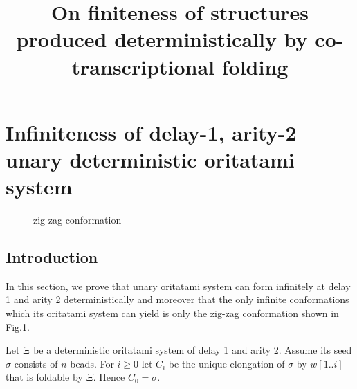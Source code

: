 \documentclass[runningheads]{llncs}
\begin{document}
\title{On finiteness of structures produced deterministically by co-transcriptional folding}

\section{Infiniteness of delay-1, arity-2 unary deterministic oritatami system}

\begin{figure}
  \begin{center}
    \caption{zig-zag conformation}
    \label{TTT_zigzag}
  \end{center}
\end{figure}

\subsection{Introduction}


In this section, we prove that unary oritatami system can form infinitely at delay 1 and arity 2 deterministically and moreover that the only infinite conformations which its oritatami system can yield is only the zig-zag conformation shown in Fig.\ref{TTT_zigzag}. 


Let $\Xi$ be a deterministic oritatami system of delay 1 and arity 2. Assume its seed $\sigma$ consists of $n$ beads.
For $i \geq 0$ let $C_i$ be the unique elongation of $\sigma$ by $w[1..i]$ that is foldable by $\Xi$. Hence $C_0 = \sigma$.
\end{document}
